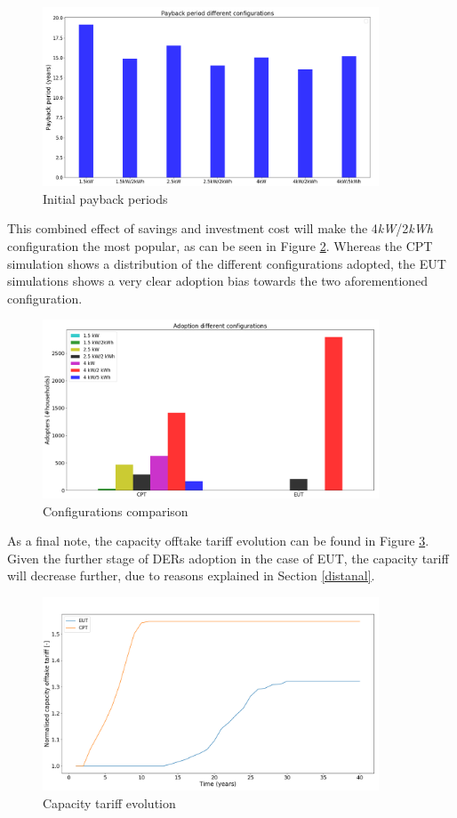 \newline 
\begin{figure}[h!]
\centering
\includegraphics[width=10cm]{EUTCompar/PayCap.png}
\caption{Initial payback periods}
\label{Figure:paycap}
\end{figure}
 \newline \newline \noindent 
 This combined effect of savings and investment cost will make the 4\textit{kW}/2\textit{kWh} configuration the most popular, as can be seen in Figure \ref{Figure:comparcap}. Whereas the CPT simulation shows a distribution of the different configurations adopted, the EUT simulations shows a very clear adoption bias towards the two aforementioned configuration. 
 \begin{figure}[h!]
\centering
\includegraphics[width=10cm]{EUTCompar/ConfigCap.png}
\caption{Configurations comparison}
\label{Figure:comparcap}
\end{figure}
\newline \newline \noindent 
 As a final note, the capacity offtake tariff evolution can be found in Figure \ref{Figure:captar}.  Given the further stage of DERs adoption in the case of EUT, the capacity tariff will decrease further, due to reasons explained in Section \ref{distanal}. 
\begin{figure}[h!]
\centering
\includegraphics[width=10cm]{EUTCompar/CapTar.png}
\caption{Capacity tariff evolution}
\label{Figure:captar}
\end{figure}
